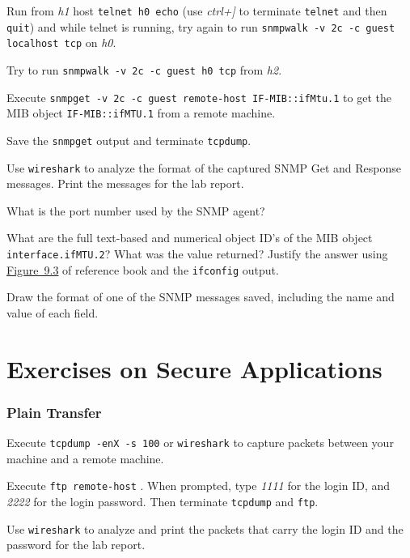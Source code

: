 \documentclass{../UTNetLab}
\begin{document}
    Run from \textit{h1} host \lstinline[emph={h0}]{telnet h0 echo} (use \textit{ctrl+]} to terminate \lstinline{telnet} and then \lstinline{quit}) and while telnet is running, try again to run \lstinline{snmpwalk -v 2c -c guest localhost tcp} on \textit{h0}.

    Try to run \lstinline[emph={h0}]{snmpwalk -v 2c -c guest h0 tcp} from \textit{h2}.

    Execute \lstinline[emph={your-host, remote-host}]{snmpget -v 2c -c guest remote-host IF-MIB::ifMtu.1} to get the MIB object \texttt{IF-MIB::ifMTU.1} from a remote machine.

    Save the \lstinline{snmpget} output and terminate \lstinline{tcpdump}.

    Use \lstinline{wireshark} to analyze the format of the captured SNMP Get and Response messages.
    Print the messages for the lab report.
    
    \begin{report}
    \item What is the port number used by the SNMP agent?
    
    \item What are the full text-based and numerical object ID’s of the MIB object \texttt{interface.ifMTU.2}? What was the value returned? Justify the answer using \hyperref[fig:9.3]{Figure~9.3} of reference book and the \lstinline{ifconfig} output.
    
    \item Draw the format of one of the SNMP messages saved, including the name and value of each field.
    \end{report}

\part{Exercises on Secure Applications}
    
\section{Plain Transfer}
    Execute \lstinline{tcpdump -enX -s 100} or \lstinline{wireshark} to capture packets between your machine and a remote machine.

    Execute \lstinline[emph={remote-host}]{ftp remote-host} .
    When prompted, type \textit{1111} for the login ID, and \textit{2222} for the login password.
    Then terminate \lstinline{tcpdump} and \lstinline{ftp}.

    Use \lstinline{wireshark} to analyze and print the packets that carry the login ID and the password for the lab report.
\end{document}
